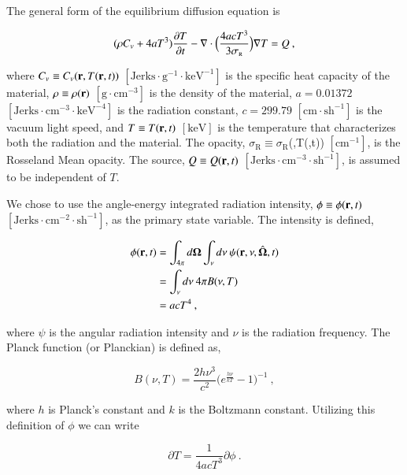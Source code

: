 \documentclass[preprint,12pt]{elsarticle}
\newcommand{\Cv}{\ensuremath{C_{v}}}
\newcommand{\ros}{\ensuremath{\sigma_{\scriptscriptstyle\mathrm{R}}}}
\newcommand{\bOmega}{\ensuremath{\mathbf{\Omega}}}
\begin{document}
The general form of the equilibrium diffusion equation is
\cite{morel_1996}

\begin{equation} 
  (\rho\Cv + 4aT^{3})\pder{T}{t} -
  \nabla\cdot{\Bigl(\frac{4acT^{3}}{3\ros}\Bigr)\grad{T}} = Q\:,
  \label{eq:eq-diff-T}
\end{equation}

where $\Cv\equiv\Cv(\ve{r},T(\ve{r},t))$
$[\text{Jerks}\cdot\text{g}^{-1}\cdot\text{keV}^{-1}]$ is the specific
heat capacity of the material, $\rho\equiv\rho(\mathbf{r})$
$[\text{g}\cdot\text{cm}^{-3}]$ is the density of the material,
$a=0.01372$ $[\text{Jerks}\cdot\text{cm}^{-3}\cdot\text{keV}^{-4}]$ is
the radiation constant, $c=299.79$ $[\text{cm}\cdot\text{sh}^{-1}]$ is
the vacuum light speed, and $T\equiv T(\mathbf{r},t)$ $[\text{keV}]$ is
the temperature that characterizes both the radiation and the
material.  The opacity, $\ros\equiv\ros$(,T(,t))
$[\text{cm}^{-1}]$, is the Rosseland Mean opacity.  The source,
$Q\equiv Q(\mathbf{r},t)$
$[\text{Jerks}\cdot\text{cm}^{-3}\cdot\text{sh}^{-1}]$, is assumed to
be independent of $T$.

We chose to use the angle-energy integrated radiation intensity,
$\phi\equiv\phi(\mathbf{r},t)$
$[\text{Jerks}\cdot\text{cm}^{-2}\cdot\text{sh}^{-1}]$, as the primary
state variable.  The intensity is defined,

\begin{equation}
  \label{eq:lte-phi}
  \begin{split}
    \phi(\ve{r},t) &=
    \int_{4\pi}d\bOmega\int_{\nu}d\nu\:\psi(\ve{r},\nu,\hat{\bOmega},t) \\
    &= \int_{\nu}d\nu\: 4\pi B(\nu,T) \\
    &= acT^{4}\:,
  \end{split}
\end{equation}

where $\psi$ is the angular radiation intensity and $\nu$ is the
radiation frequency.  The Planck function (or Planckian) is defined
as,

\begin{equation}
  B(\nu,T)=\frac{2h\nu^{3}}{c^{2}}\bigl(e^{\frac{h\nu}{kT}} -
  1\bigr)^{-1}\:,
\end{equation}

where $h$ is Planck's constant and $k$ is the Boltzmann constant.
Utilizing this definition of $\phi$ we can write

\begin{equation}
  \label{eq:partial-T}
  \partial T = \frac{1}{4acT^{3}}\partial\phi\:.
\end{equation}
\end{document}
